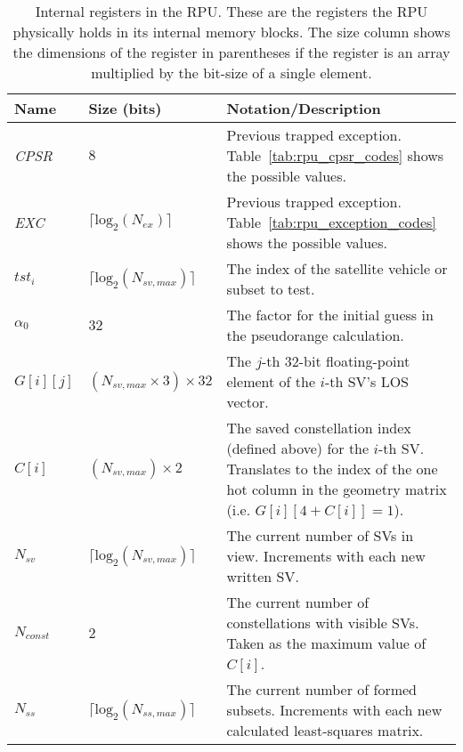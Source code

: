 \documentclass[11pt]{article}
\begin{document}
\begin{table}[htbp] \begin{center}
  \caption{Internal registers in the RPU. These are the registers the RPU physically holds in its internal memory blocks. The size column shows the dimensions of the register in parentheses if the register is an array multiplied by the bit-size of a single element.}
  \label{tab:rpu_internal_registers}
  \begin{tabular}{|m{1.5cm}|m{2.5cm}|m{7cm}|}
    \hline

    \textbf{Name} & \textbf{Size (bits)} & \textbf{Notation/Description}\\ \hline

    \emph{CPSR} & $8$ & Previous trapped exception. Table~\ref{tab:rpu_cpsr_codes} shows the possible values.\\ \hline

    \emph{EXC} & $\lceil{\text{log}_2(N_{ex})}\rceil$ & Previous trapped exception. Table~\ref{tab:rpu_exception_codes} shows the possible values.\\ \hline

    $tst_i$ & $\lceil{\text{log}_2(N_{sv,max})}\rceil$ & The index of the satellite vehicle or subset to test.\\ \hline

    $\alpha_0$ & $32$ & The factor for the initial guess in the pseudorange calculation.\\ \hline

    $G[i][j]$ & $(N_{sv,max} \times 3) \times 32$ & The $j$-th 32-bit floating-point element of the $i$-th SV's LOS vector.\\ \hline

    $C[i]$ & $(N_{sv,max}) \times 2$ & The saved constellation index (defined above) for the $i$-th SV. Translates to the index of the one hot column in the geometry matrix (i.e. $G[i][4+C[i]]=1$).\\ \hline

    $N_{sv}$ & $\lceil{\text{log}_2(N_{sv,max})}\rceil$ & The current number of SVs in view. Increments with each new written SV.\\ \hline

    $N_{const}$ & $2$ & The current number of constellations with visible SVs. Taken as the maximum value of $C[i]$.\\ \hline

    $N_{ss}$ & $\lceil{\text{log}_2(N_{ss,max})}\rceil$ & The current number of formed subsets. Increments with each new calculated least-squares matrix.\\ \hline


\end{tabular}
\end{center}
\end{table}
\end{document}
